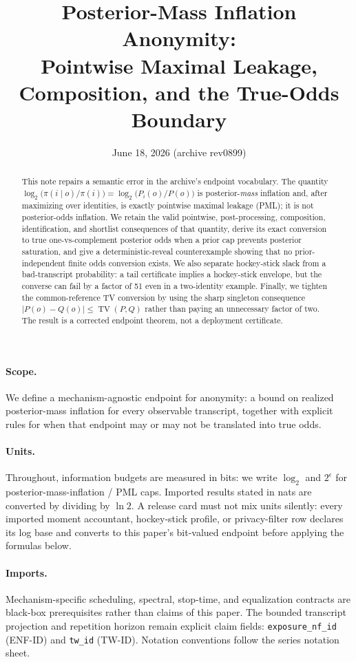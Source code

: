 \documentclass[11pt]{article}
\title{Posterior-Mass Inflation Anonymity:\\ Pointwise Maximal Leakage, Composition, and the True-Odds Boundary}
\author{}
\date{June 18, 2026 (archive rev0899)}
\DeclareMathOperator{\TV}{TV}
\theoremstyle{definition}
\theoremstyle{remark}
\begin{document}
\maketitle

\begin{abstract}
This note repairs a semantic error in the archive's endpoint vocabulary.
The quantity
$\log_2\!\bigl(\pi(i\mid o)/\pi(i)\bigr)=\log_2\!\bigl(P_i(o)/P(o)\bigr)$
is posterior-\emph{mass} inflation and, after maximizing over identities, is exactly pointwise maximal leakage (PML); it is not posterior-odds inflation.
We retain the valid pointwise, post-processing, composition, identification, and shortlist consequences of that quantity, derive its exact conversion to true one-vs-complement posterior odds when a prior cap prevents posterior saturation, and give a deterministic-reveal counterexample showing that no prior-independent finite odds conversion exists.
We also separate hockey-stick slack from a bad-transcript probability: a tail certificate implies a hockey-stick envelope, but the converse can fail by a factor of 51 even in a two-identity example.
Finally, we tighten the common-reference TV conversion by using the sharp singleton consequence $|P(o)-Q(o)|\le \TV(P,Q)$ rather than paying an unnecessary factor of two.
The result is a corrected endpoint theorem, not a deployment certificate.
\end{abstract}
\paragraph{Scope.}
We define a mechanism-agnostic endpoint for anonymity: a bound on realized posterior-mass inflation for every observable transcript, together with explicit rules for when that endpoint may or may not be translated into true odds.

\paragraph{Units.} Throughout, information budgets are measured in bits: we write $\log_2$ and $2^{\epsilon}$ for posterior-mass-inflation / PML caps. Imported results stated in nats are converted by dividing by $\ln 2$.
A release card must not mix units silently: every imported moment accountant, hockey-stick profile, or privacy-filter row declares its log base and converts to this paper's bit-valued endpoint before applying the formulas below.

\paragraph{Imports.}
Mechanism-specific scheduling, spectral, stop-time, and equalization contracts are black-box prerequisites rather than claims of this paper.\cite{series:schedcompiler,series:spectral,series:stoptimeaddendum,series:knapsacktransport}
The bounded transcript projection and repetition horizon remain explicit claim fields: \texttt{exposure\_nf\_id} (ENF-ID) and \texttt{tw\_id} (TW-ID).\cite{series:traceifaces,series:threatwindows}
Notation conventions follow the series notation sheet.\cite{series:notation}
\end{document}
